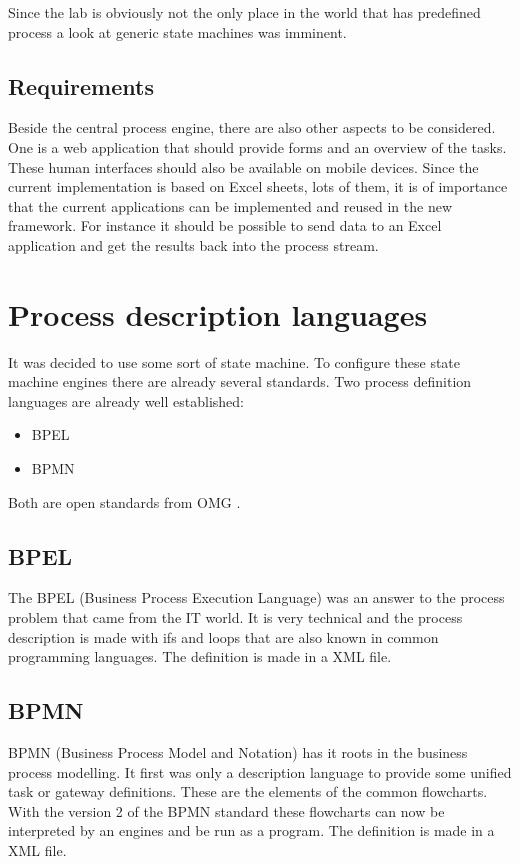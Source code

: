\documentclass[paper=a4,twoside=false,BCOR=0mm,DIV=calc,fontsize=12pt]{scrartcl}
\begin{document}
Since the lab is obviously not the only place in the world that has predefined process a look at generic state machines was imminent.


\subsection{Requirements}
Beside the central process engine, there are also other aspects to be considered. One is a web application that should provide forms and an overview
of the tasks. These human interfaces should also be available on mobile devices.
Since the current implementation is based on Excel sheets, lots of them, it is of importance that the current applications can be implemented and reused in the new framework.
For instance it should be possible to send data to an Excel application and get the results back into the process stream.

\section{Process description languages}
It was decided to use some sort of state machine. To configure these state machine engines there are already several standards. 
Two process definition languages are already well established:

\begin{itemize}
 \item BPEL
 \item BPMN
\end{itemize}

Both are open standards from OMG \cite{omg}.

\subsection{BPEL}
The BPEL (Business Process Execution Language) \cite{bpel} was an answer to the process problem that came from the IT world. It is very technical and the process description is made with ifs and loops that are also known in common programming languages. The definition is made in a XML file. 

\subsection{BPMN}
BPMN (Business Process Model and Notation) \cite{bpmn} has it roots in the business process modelling. It first was only a description language to provide some unified task or gateway definitions. These are the elements of the common flowcharts. 
With the version 2 of the BPMN standard these flowcharts can now be interpreted by an engines and be run as a program.
The definition is made in a XML file. 
\end{document}
